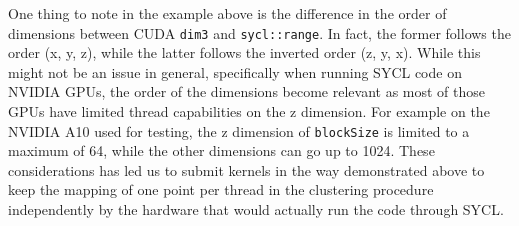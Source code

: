 One thing to note in the example above is the difference in the order of dimensions between CUDA \Verb "dim3" and \Verb "sycl::range". In fact, the former follows the order (x, y, z), while the latter follows the inverted order (z, y, x). While this might not be an issue in general, specifically when running SYCL code on NVIDIA GPUs, the order of the dimensions become relevant as most of those GPUs have limited thread capabilities on the z dimension. For example on the NVIDIA A10 used for testing, the z dimension of \Verb "blockSize" is limited to a maximum of 64, while the other dimensions can go up to 1024.
These considerations has led us to submit kernels in the way demonstrated above to keep the mapping of one point per thread in the clustering procedure independently by the hardware that would actually run the code through SYCL. 

